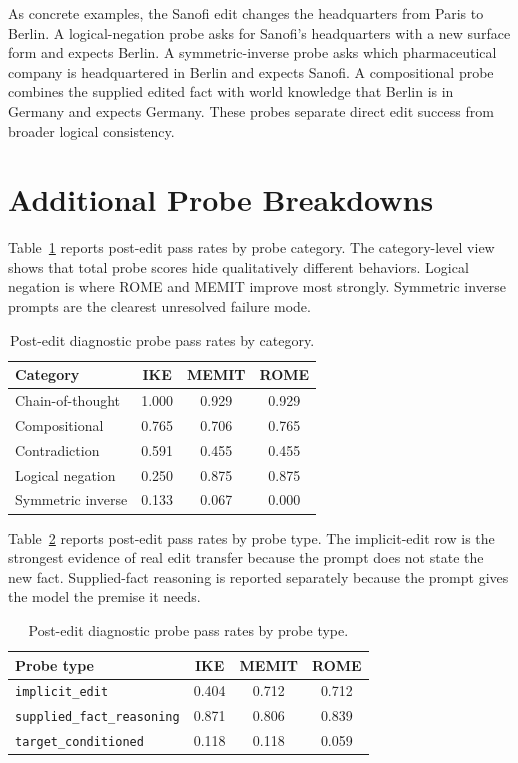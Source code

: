 \documentclass[11pt]{article}
\begin{document}
As concrete examples, the Sanofi edit changes the headquarters from Paris to Berlin. A logical-negation probe asks for Sanofi's headquarters with a new surface form and expects Berlin. A symmetric-inverse probe asks which pharmaceutical company is headquartered in Berlin and expects Sanofi. A compositional probe combines the supplied edited fact with world knowledge that Berlin is in Germany and expects Germany. These probes separate direct edit success from broader logical consistency.

\section{Additional Probe Breakdowns}

Table~\ref{tab:category} reports post-edit pass rates by probe category. The category-level view shows that total probe scores hide qualitatively different behaviors. Logical negation is where ROME and MEMIT improve most strongly. Symmetric inverse prompts are the clearest unresolved failure mode.

\begin{table}[h]
\centering
\small
\begin{tabular}{lccc}
\toprule
Category & IKE & MEMIT & ROME \\
\midrule
Chain-of-thought & 1.000 & 0.929 & 0.929 \\
Compositional & 0.765 & 0.706 & 0.765 \\
Contradiction & 0.591 & 0.455 & 0.455 \\
Logical negation & 0.250 & 0.875 & 0.875 \\
Symmetric inverse & 0.133 & 0.067 & 0.000 \\
\bottomrule
\end{tabular}
\caption{Post-edit diagnostic probe pass rates by category.}
\label{tab:category}
\end{table}

Table~\ref{tab:type} reports post-edit pass rates by probe type. The implicit-edit row is the strongest evidence of real edit transfer because the prompt does not state the new fact. Supplied-fact reasoning is reported separately because the prompt gives the model the premise it needs.

\begin{table}[h]
\centering
\small
\begin{tabular}{lccc}
\toprule
Probe type & IKE & MEMIT & ROME \\
\midrule
\texttt{implicit\_edit} & 0.404 & 0.712 & 0.712 \\
\texttt{supplied\_fact\_reasoning} & 0.871 & 0.806 & 0.839 \\
\texttt{target\_conditioned} & 0.118 & 0.118 & 0.059 \\
\bottomrule
\end{tabular}
\caption{Post-edit diagnostic probe pass rates by probe type.}
\label{tab:type}
\end{table}
\end{document}
